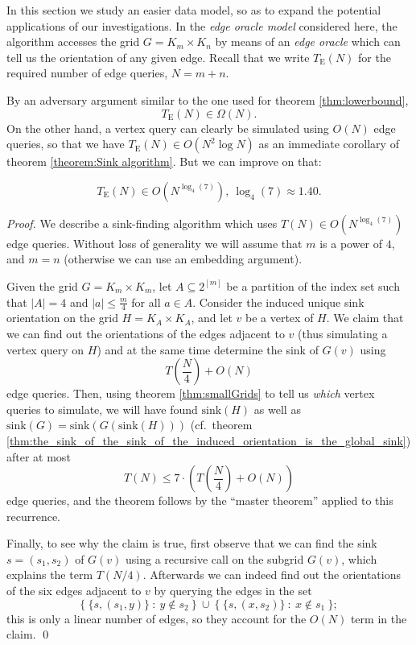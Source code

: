 \documentclass[runningheads,a4paper]{llncs}
\newcommand{\timeEdge}{\ensuremath{T_\mathrm{E}}}
\newcommand{\sink}{\ensuremath{\mathrm{sink}}}
\begin{document}
In this section we study an easier data model, so as to expand the potential
applications of our investigations.
In the \emph{edge oracle model} considered here, the algorithm accesses the
grid $G = K_m \times K_n$ by means of an \emph{edge oracle} which can tell us
the orientation of any given edge.
Recall that we write $\timeEdge(N)$ for the required number of edge queries,
$N = m+n$.

By an adversary argument similar to the one used for theorem
\ref{thm:lowerbound},
\[
    \timeEdge(N) \in \Omega(N).
\]
On the other hand, a vertex query can clearly be simulated using $O(N)$ edge
queries, so that we have $\timeEdge(N) \in O(N^2 \log N)$ as an immediate
corollary of theorem \ref{theorem:Sink algorithm}.
But we can improve on that:

\begin{theorem}
    \label{thm:timeEdge}
    \[
        \timeEdge(N) \in O(N ^ {\log_4(7)}),~ \log_4(7) \approx 1.40.
    \]
\end{theorem}

\begin{proof}
    We describe a sink-finding algorithm which uses
    $T(N) \in O(N ^ {\log_4(7)})$ edge queries.
    Without loss of generality we will assume that $m$ is a power of $4$, and
    $m=n$ (otherwise we can use an embedding argument).

    Given the grid $G = K_m \times K_m$, let $A \subseteq 2 ^ {[m]}$
    be a partition of the index set such that
    $|A| = 4$ and $|a| \le \frac{m}{4}$ for all $a \in A$.
    Consider the induced unique sink orientation on the grid
    $H = K_A \times K_A$, and let $v$ be a vertex of $H$.
    We claim that we can find out the orientations of the edges adjacent to
    $v$ (thus simulating a vertex query on $H$)
    and at the same time determine the sink of $G(v)$ using
    \[
        T \left( \frac{N}{4} \right) + O(N)
    \]
    edge queries.
    Then, using theorem \ref{thm:smallGrids} to tell us \emph{which} vertex
    queries to simulate, we will have found $\sink(H)$ as well as
    $\sink(G) = \sink(G(\sink(H)))$ (cf.~theorem
    \ref{thm:the_sink_of_the_sink_of_the_induced_orientation_is_the_global_sink})
    after at most
    \[
        T(N) \le 7 \cdot \left( T \left( \frac{N}{4} \right) + O(N) \right)
    \]
    edge queries, and the theorem follows by the ``master theorem'' applied to
    this recurrence.

    Finally, to see why the claim is true, first observe that we can find the
    sink $s = (s_1,s_2)$ of $G(v)$ using a recursive call on the subgrid
    $G(v)$, which explains the term $T(N/4)$.
    Afterwards we can indeed find out the orientations of the six edges
    adjacent to $v$ by querying the edges in the set
    \[
        \bigl\{~ \{ s,(s_1,y) \} ~:~ y \notin s_2 ~\bigr\}
        ~\cup~
        \bigl\{~ \{ s,(x,s_2) \} ~:~ x \notin s_1 ~\bigr\};
    \]
    this is only a linear number of edges, so they account for the $O(N)$
    term in the claim. \qed
\end{proof}
\end{document}
